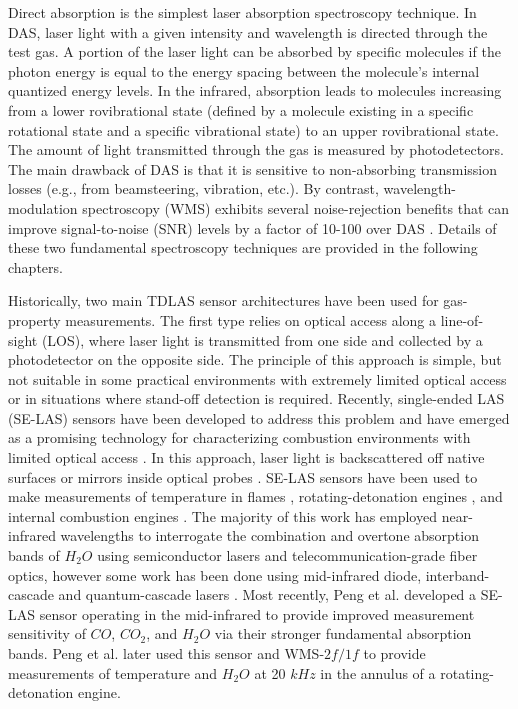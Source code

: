 Direct absorption is the simplest laser absorption spectroscopy technique. In DAS, laser light with a given intensity and wavelength is directed through the test gas. A portion of the laser light can be absorbed by specific molecules if the photon energy is equal to the energy spacing between the molecule's internal quantized energy levels. In the infrared, absorption leads to molecules increasing from a lower rovibrational state (defined by a molecule existing in a specific rotational state and a specific vibrational state) to an upper rovibrational state. The amount of light transmitted through the gas is measured by photodetectors. The main drawback of DAS is that it is sensitive to non-absorbing transmission losses (e.g., from beamsteering, vibration, etc.). By contrast, wavelength-modulation spectroscopy (WMS) exhibits several noise-rejection benefits that can improve signal-to-noise (SNR) levels by a factor of 10-100 over DAS \cite{Rieker2009b}. Details of these two fundamental spectroscopy techniques are provided in the following chapters.

Historically, two main TDLAS sensor architectures have been used for gas-property measurements. The first type relies on optical access along a line-of-sight (LOS), where laser light is transmitted from one side and collected by a photodetector on the opposite side. The principle of this approach is simple, but not suitable in some practical environments with extremely limited optical access or in situations where stand-off detection is required. Recently, single-ended LAS (SE-LAS) sensors have been developed to address this problem and have emerged as a promising technology for characterizing combustion environments with limited optical access \cite{Goldenstein2017}. In this approach, laser light is backscattered off native surfaces \cite{Dubinsky1998, Wainner2002, Wang2015, Goldenstein:16, Peng:16, Peng2018} or mirrors inside optical probes \cite{RIEKER20073041, Rein:10, Chen2010, 0957-0233-25-11-115501, GIRARD2017158}. SE-LAS sensors have been used to make measurements of temperature in flames \cite{Goldenstein:16,Peng:16}, rotating-detonation engines \cite{Rein2017, Peng2018}, and internal combustion engines \cite{Melin2017}. The majority of this work has employed near-infrared wavelengths to interrogate the combination and overtone absorption bands of $H_2O$ using semiconductor lasers and telecommunication-grade fiber optics, however some work has been done using mid-infrared diode, interband-cascade and quantum-cascade lasers \cite{Peng2018, 0957-0233-25-11-115501, GIRARD2017158}. Most recently, Peng et al. \cite{Peng:16} developed a SE-LAS sensor operating in the mid-infrared to provide improved measurement sensitivity of $CO$, $CO_2$, and $H_2O$ via their stronger fundamental absorption bands. Peng et al. \cite{Peng2018} later used this sensor and WMS-$2f/1f$ to provide measurements of temperature and $H_2O$ at 20 $kHz$ in the annulus of a rotating-detonation engine.

